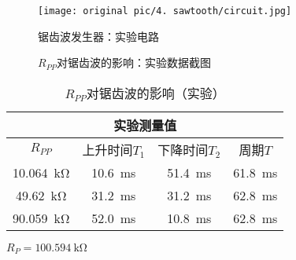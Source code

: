 \documentclass[UTF8]{ctexart}
\numberwithin{figure}{subsection}
\numberwithin{table}{subsection}
\numberwithin{equation}{subsection}
\begin{document}
\begin{figure}[H]
    \begin{center}
        \caption{锯齿波发生器：实验电路}
        \texttt{[image: original pic/4. sawtooth/circuit.jpg]}
        \label{sawtooth exp circuit}
    \end{center}
\end{figure}


\begin{figure}[H]
    \centering
    


    
    \caption{\(R_{PP}\)对锯齿波的影响：实验数据截图}
    \label{sawtooth exp pic}
\end{figure}


\begin{table}[h]
    \begin{center}
        \caption{\(R_{PP}\)对锯齿波的影响（实验）}
        \begin{tabular}{|c|c|c|c|}
            \hline
            \multicolumn{4}{|c|}{实验测量值} \\
            \hline
            \(R_{PP}\)  & 上升时间\(T_1\) & 下降时间\(T_2\) & 周期\(T\)\\
            \hline
            \SI{10.064}{\kilo\ohm} & \SI{10.6}{\milli\second} & \SI{51.4}{\milli\second} & \SI{61.8}{\milli\second} \\
            \hline
            \SI{49.62}{\kilo\ohm} & \SI{31.2}{\milli\second} & \SI{31.2}{\milli\second} & \SI{62.8}{\milli\second} \\
            \hline
            \SI{90.059}{\kilo\ohm} & \SI{52.0}{\milli\second} & \SI{10.8}{\milli\second} & \SI{62.8}{\milli\second} \\
            \hline
            
        \end{tabular}
        \par \(R_P = \SI{100.594}{\kilo\ohm}\)
    \end{center}
    \label{sawtooth wave f exp data}
\end{table}
\end{document}
